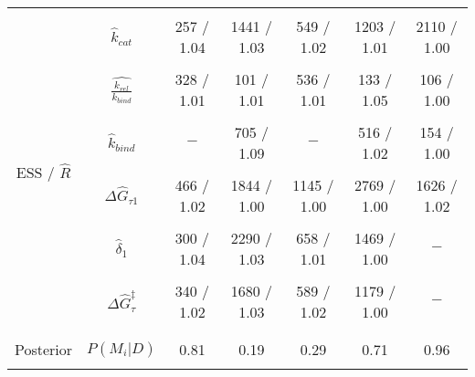 \documentclass[10pt,letterpaper]{article}
\begin{document}
\begin{table}[!ht]
\begin{adjustwidth}{-2.25in}{0in}
{\begin{tabular}{|cc|cc|cc|c|}
&&&&&& \\

\hline
&&&&&& \\




\multirow{12}{1.4cm}{ESS  / $\hat{R}$} &$\hat{k}_{cat}$ & 257 / 1.04   & 1441 / 1.03 & 549 / 1.02 & 1203 / 1.01  & 2110 / 1.00 \\
&&&&&& \\

 &$\hat{\frac{k_{rel}}{k_{bind}}}$  & 328 / 1.01   & 101 / 1.01 & 536 / 1.01 & 133 / 1.05  & 106 / 1.00 \\
&&&&&& \\


&$\hat{k}_{bind}$    & $-$   & 705 / 1.09 & $-$ & 516 / 1.02  & 154 / 1.00 \\
&&&&&& \\

&$\Delta \hat{G}_{\tau 1}$ & 466 / 1.02   & 1844 / 1.00 & 1145 / 1.00 & 2769 / 1.00  & 1626 / 1.02 \\
&&&&&& \\



&$\hat{\delta}_1$   & 300 / 1.04   & 2290 / 1.03 & 658 / 1.01 & 1469 / 1.00  & $-$ \\
&&&&&& \\

&$\Delta \hat{G}^\ddag_{\tau}$   & 340 / 1.02   & 1680 / 1.03 & 589 / 1.02 & 1179 / 1.00  & $-$ \\






&&&&&& \\
\hline

&&&&&& \\
Posterior &$P(M_i|D)$  & 0.81  & 0.19 & 0.29 & 0.71 & 0.96  \\
&&&&&& \\
\hline


\end{tabular}}
\end{adjustwidth}
\end{table}
\end{document}
